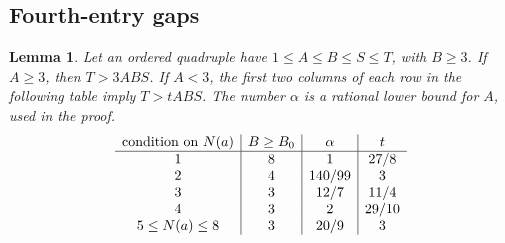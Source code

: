 \documentclass[12pt]{article}
\newtheorem{lemma}[theorem]{Lemma}
\numberwithin{equation}{section}
\begin{document}
\subsection{Fourth-entry gaps}

\begin{lemma}\label{lem:five-frontier-gaps}
Let an ordered quadruple have \(1\le A\le B\le S\le T\), with
\(B\ge3\). If \(A\ge3\), then \(T>3ABS\).
If \(A<3\), the first two columns of each row in the following
table imply \(T>tABS\). The number \(\alpha\) is a rational lower
bound for \(A\), used in the proof.
\[
\begin{array}{c|c|c|c}
\hbox{condition on }N(a)&B\ge B_0&\alpha&t\\\hline
1&8&1&27/8\\
2&4&140/99&3\\
3&3&12/7&11/4\\
4&3&2&29/10\\
5\le N(a)\le8&3&20/9&3
\end{array}
\]
\end{lemma}
\end{document}
